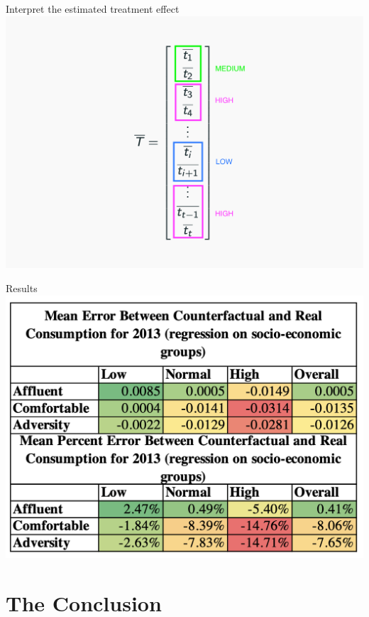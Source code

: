 \documentclass{beamer}
\begin{document}
\begin{frame}{Interpret the estimated treatment effect}
  \centering
  \includegraphics[width=1\textwidth]{images/linear-treatment-hours.png}
\end{frame}

\begin{frame}{Results}
  \centering
  \includegraphics[width=1\textwidth]{images/agg-linreg-consumption2.png}
\end{frame}

\section{The Conclusion}
\end{document}

